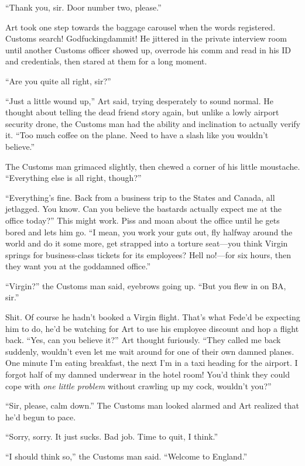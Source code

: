 “Thank you, sir. Door number two, please.”

Art took one step towards the baggage carousel when the words
registered. Customs search! Godfuckingdammit! He jittered in the
private interview room until another Customs officer showed up,
overrode his comm and read in his ID and credentials, then stared
at them for a long moment.

“Are you quite all right, sir?”

“Just a little wound up,” Art said, trying desperately to sound
normal. He thought about telling the dead friend story again, but
unlike a lowly airport security drone, the Customs man had the
ability and inclination to actually verify it. “Too much coffee on
the plane. Need to have a slash like you wouldn’t believe.”

The Customs man grimaced slightly, then chewed a corner of his
little moustache. “Everything else is all right, though?”

“Everything’s fine. Back from a business trip to the States and
Canada, all jetlagged. You know. Can you believe the bastards
actually expect me at the office today?” This might work. Piss and
moan about the office until he gets bored and lets him go. “I mean,
you work your guts out, fly halfway around the world and do it some
more, get strapped into a torture seat—you think Virgin springs for
business-class tickets for its employees? Hell no!—for six hours,
then they want you at the goddamned office.”

“Virgin?” the Customs man said, eyebrows going up. “But you flew in
on BA, sir.”

Shit. Of course he hadn’t booked a Virgin flight. That’s what
Fede’d be expecting him to do, he’d be watching for Art to use his
employee discount and hop a flight back. “Yes, can you believe it?”
Art thought furiously. “They called me back suddenly, wouldn’t even
let me wait around for one of their own damned planes. One minute
I’m eating breakfast, the next I’m in a taxi heading for the
airport. I forgot half of my damned underwear in the hotel room!
You’d think they could cope with \emph{one little problem} without
crawling up my cock, wouldn’t you?”

“Sir, please, calm down.” The Customs man looked alarmed and Art
realized that he’d begun to pace.

“Sorry, sorry. It just sucks. Bad job. Time to quit, I think.”

“I should think so,” the Customs man said. “Welcome to England.”

